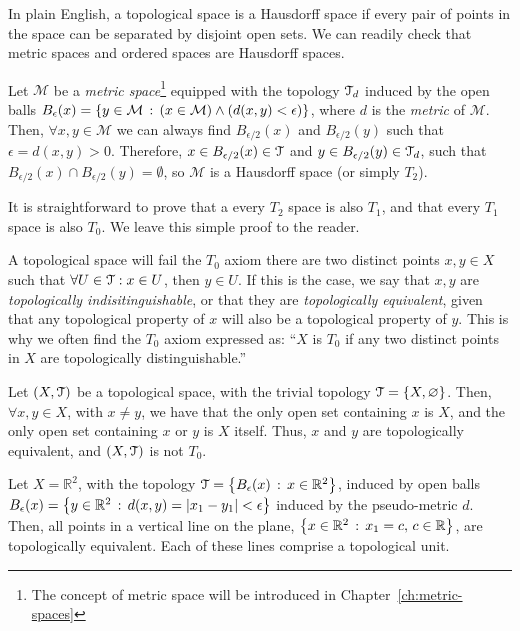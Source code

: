 \begin{remark}
	In plain English, a topological space is a Hausdorff space if every pair of points in the space can be separated by disjoint open sets.
	We can readily check that metric spaces and ordered spaces are Hausdorff spaces.
\end{remark}

\begin{example}
	Let $\mathcal{M}$ be a \emph{metric space}\footnote{The concept of metric space will be introduced in Chapter~\ref{ch:metric-spaces}} equipped with the topology $\EuScript{T}_d$ induced by the open balls $B_\epsilon(x)=\left\{y\in \mathcal{M}\,:\,(x\in\mathcal{M})\land (d(x,y)<\epsilon)\right\}$, where $d$ is the \emph{metric} of $\mathcal{M}$. Then, $\forall x,y \in \mathcal{M}$ we can always find $B_{\epsilon/2}(x)$ and $B_{\epsilon/2}(y)$ such that $\epsilon=d(x,y) > 0$.
	Therefore, $x\in B_{\epsilon/2}(x)\in\EuScript{T}$ and $y\in B_{\epsilon/2}(y)\in \EuScript{T}_d$, such that $B_{\epsilon/2}(x)\cap B_{\epsilon/2}(y)=\emptyset$, so $\mathcal{M}$ is a Hausdorff space (or simply $T_2$).
\end{example}

It is straightforward to prove that a every $T_2$ space is also $T_1$, and that every $T_1$ space is also $T_0$. We leave this simple proof to the reader.

\begin{remark}
	A topological space will fail the $T_0$ axiom \iff there are two distinct points $x,y\in X$ such that $\forall U\in\EuScript{T}: x\in U$, then $y\in U$. If this is the case, we say that $x,y$  are \emph{topologically indisitinguishable}, or that they are \emph{topologically equivalent}, given that any topological property of $x$ will also be a topological property of $y$. This is why we often find the $T_0$ axiom expressed as: ``$X$ is $T_0$ if any two distinct points in $X$ are topologically distinguishable.''
\end{remark}

\begin{example}
	Let $(X,\EuScript{T})$ be a topological space, with the trivial topology $\EuScript{T}=\{X,\varnothing\}$.
	Then, $\forall x,y\in X$, with $x\neq y$, we have that the only open set containing $x$ is $X$, and the only open set containing $x$ or $y$ is $X$ itself. Thus, $x$ and $y$ are topologically equivalent, and $(X,\EuScript{T})$ is not $T_0$.
\end{example}

\begin{example}
	Let $X=\mathbb{R}^2$, with the topology $\EuScript{T}=\left\{B_\epsilon(x)\,:\,x\in\mathbb{R}^2\right\}$, induced by open balls $B_\epsilon(x)=\left\{y\in\mathbb{R}^2\,:\,d(x,y)=|x_1-y_1|<\epsilon\right\}$ induced by the pseudo-metric $d$.
	Then, all points in a vertical line on the plane, $\left\{x\in \mathbb{R}^2\,:\,x_1=c,\,c\in \mathbb{R}\right\}$, are topologically equivalent.
	Each of these lines comprise a topological unit.
\end{example}

